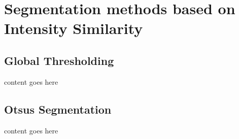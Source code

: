 \chapter{Segmentation methods based on Intensity Similarity}
\section{Global Thresholding}
content goes here

\section{Otsus Segmentation}
content goes here

